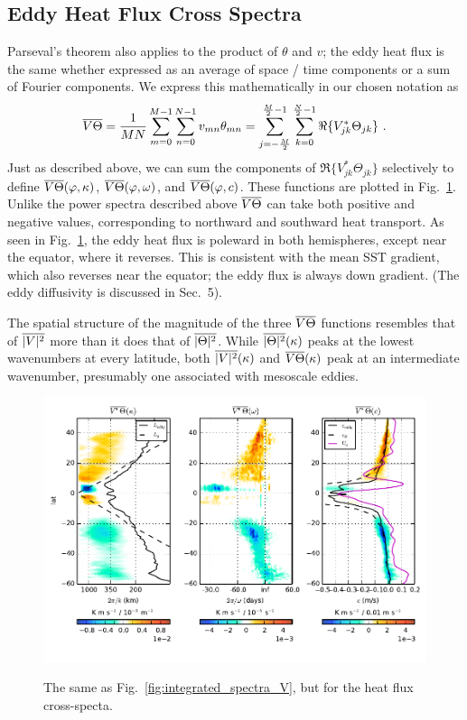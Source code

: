 \documentclass[10pt]{article}
\newcommand{\ol}{\ensuremath{\overline}}
\begin{document}
\subsection{Eddy Heat Flux Cross Spectra}

Parseval's theorem also applies to the product of $\theta$ and $v$; the eddy heat flux is the same whether expressed as an average of space / time components or a sum of Fourier components. We express this mathematically in our chosen notation as
\begin{equation}
\ol{V\Theta} = \frac{1}{MN} \sum_{m=0}^{M-1} \sum_{n=0}^{N-1} v_{mn} \theta_{mn} = \sum_{j=-\frac{M}{2}}^{\frac{M}{2}-1} \sum_{k=0}^{\frac{N}{2}-1} \Re \{ V_{jk}^\ast  \Theta_{jk} \} \ .
\end{equation}
Just as described above, we can sum the components of $\Re \{ V_{jk}^\ast  \Theta_{jk} \}$ selectively to define $\ol{V\Theta}(\varphi, \kappa)$, $\ol{V\Theta}(\varphi, \omega)$, and $\ol{V\Theta}(\varphi, c)$. These functions are plotted in  Fig.~\ref{fig:integrated_spectra_VT}. Unlike the power spectra described above $\ol{V\Theta}$ can take both positive and negative values, corresponding to northward and southward heat transport. As seen in Fig.~\ref{fig:integrated_spectra_VT}, the eddy heat flux is poleward in both hemispheres, except near the equator, where it reverses. This is consistent with the mean SST gradient, which also reverses near the equator; the eddy flux is always down gradient. (The eddy diffusivity is discussed in Sec.~5).

The spatial structure of the magnitude of the three $\ol{V\Theta}$ functions resembles that of $\ol{|V|^2}$ more than it does that of $\ol{|\Theta|^2}$. While $\ol{|\Theta|^2}(\kappa)$ peaks at the lowest wavenumbers at every latitude, both  $\ol{|V|^2}(\kappa)$ and $\ol{V\Theta}(\kappa)$ peak at an intermediate wavenumber, presumably one associated with mesoscale eddies.

\begin{figure}[t]
  \noindent\includegraphics{../figures/50degwide/integrated_spectra_VT.pdf}\\
  \caption{The same as Fig.~\ref{fig:integrated_spectra_V}, but for the heat flux cross-specta.}
  \label{fig:integrated_spectra_VT}
\end{figure}
\end{document}
